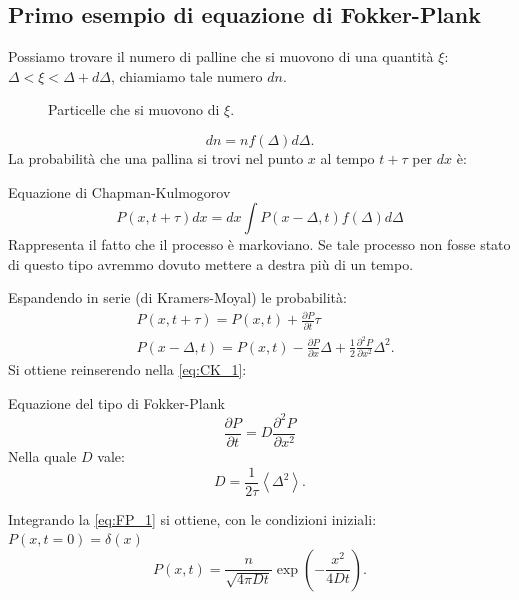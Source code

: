 \subsection{Primo esempio di equazione di Fokker-Plank}%
Possiamo trovare il numero di palline che si muovono di una quantità $\xi$: $\Delta < \xi < \Delta  + d\Delta$, chiamiamo tale numero $dn$.
\begin{figure}[H]
    \centering
    \caption{Particelle che si muovono di $\xi$.}
    \label{fig:1-brown}
\end{figure}
\[
    dn = n f(\Delta) d\Delta
.\] 
La probabilità che una pallina si trovi nel punto $x$ al tempo $t+\tau$ per $dx$ è:
\begin{greenbox}{Equazione di Chapman-Kulmogorov}
 \begin{equation}
    P(x,t+\tau) dx = dx \int P(x-\Delta,t) f(\Delta) d\Delta \label{eq:CK_1}
\end{equation}
Rappresenta il fatto che il processo è markoviano. Se tale processo non fosse stato di questo tipo avremmo dovuto mettere a destra più di un tempo.
\end{greenbox}
\noindent
Espandendo in serie (di Kramers-Moyal) le probabilità:
\[\begin{aligned}
    &P(x, t+\tau) = P(x, t) + \frac{\partial P}{\partial t} \tau  \\
    & P(x-\Delta,t) = P(x,t) - \frac{\partial P}{\partial x} \Delta  + \frac{1}{2}\frac{\partial ^2 P}{\partial x^2} \Delta^2
.\end{aligned}\]
Si ottiene reinserendo nella \ref{eq:CK_1}:
\begin{redbox}{Equazione del tipo di Fokker-Plank}
     \begin{equation}
	\frac{\partial P}{\partial t} = D \frac{\partial ^2P}{\partial x^2} \label{eq:FP_1}
    \end{equation}
Nella quale $D$ vale:
\[
    D = \frac{1}{2\tau}\left<\Delta^2\right>
.\]    
\end{redbox}

\noindent
Integrando la \ref{eq:FP_1} si ottiene, con le condizioni iniziali: $P(x,t=0) = \delta(x)$
\[
    P(x,t) = \frac{n}{\sqrt{4\pi Dt}}\exp\left(-\frac{x^2}{4Dt}\right)   
.\] 

